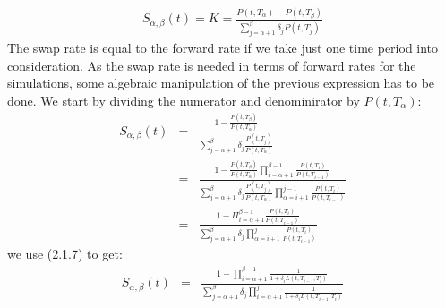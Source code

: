 \documentclass[11pt]{article}
\numberwithin{equation}{subsection}
\begin{document}
\begin{eqnarray}
S_{\alpha, \beta}(t) = K = \frac{P(t, T_{\alpha}) - P(t, T_{\beta})}{\sum_{j=\alpha+1}^{\beta} \delta_{j} P(t, T_j)}
\end{eqnarray}
The swap rate is equal to the forward rate if we take just one time period into consideration. As the swap rate is needed in terms of forward rates for the simulations, some algebraic manipulation of the previous expression has to be done. We start by dividing the numerator and denominirator by \(P(t, T_{\alpha})\):
\begin{eqnarray*}
S_{\alpha, \beta}(t) &=& \frac{1- \frac{P(t, T_{\beta})}{P(t, T_{\alpha})}}{\sum_{j=\alpha+1}^{\beta} \delta_{j} \frac{P(t, T_j)}{P(t, T_{\alpha})}} \\
&=& \frac{1- \frac{P(t, T_{\beta})}{P(t, T_{\alpha})} \displaystyle \prod_{i=\alpha+1}^{\beta-1}{\frac{P(t, T_i)}{P(t, T_{i-1})}}}{\sum_{j=\alpha+1}^{\beta} \delta_{j} \frac{P(t, T_j)}{P(t, T_{\alpha})} \displaystyle \prod_{\alpha=i+1}^{j-1}{\frac{P(t, T_i)}{P(t, T_{i-1})}} }  \\
&=& \frac{1-\Pi_{i=\alpha+1}^{\beta-1}{\frac{P(t, T_i)}{P(t, T_{i-1})}}}{\sum_{j=\alpha + 1}^{\beta} \delta_j \displaystyle \prod_{\alpha=i+1}^{j}{\frac{P(t, T_i)}{P(t, T_{i-1})}}}
\end{eqnarray*}
we use (2.1.7) to get:
\begin{eqnarray}
S_{\alpha, \beta}(t) &=& \frac{1-\displaystyle \prod_{i=\alpha+1}^{\beta-1}{\frac{1}{1+\delta_i L(t, T_{i-1}, T_i)}}}{\sum_{j=\alpha + 1}^{\beta} \delta_j \displaystyle\prod_{i=\alpha+1}^{j}{\frac{1}{1 + \delta_{i} L(t, T_{i-1}, T_i)}}}
\end{eqnarray}
\end{document}
